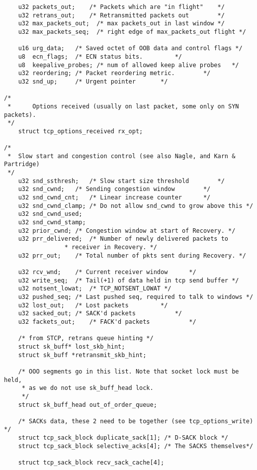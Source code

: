 \begin{verbatim}
    u32 packets_out;    /* Packets which are "in flight"    */
    u32 retrans_out;    /* Retransmitted packets out        */
    u32 max_packets_out;  /* max packets_out in last window */
    u32 max_packets_seq;  /* right edge of max_packets_out flight */

    u16 urg_data;   /* Saved octet of OOB data and control flags */
    u8  ecn_flags;  /* ECN status bits.         */
    u8  keepalive_probes; /* num of allowed keep alive probes   */
    u32 reordering; /* Packet reordering metric.        */
    u32 snd_up;     /* Urgent pointer       */

/*
 *      Options received (usually on last packet, some only on SYN packets).
 */
    struct tcp_options_received rx_opt;

/*
 *  Slow start and congestion control (see also Nagle, and Karn & Partridge)
 */
    u32 snd_ssthresh;   /* Slow start size threshold        */
    u32 snd_cwnd;   /* Sending congestion window        */
    u32 snd_cwnd_cnt;   /* Linear increase counter      */
    u32 snd_cwnd_clamp; /* Do not allow snd_cwnd to grow above this */
    u32 snd_cwnd_used;
    u32 snd_cwnd_stamp;
    u32 prior_cwnd; /* Congestion window at start of Recovery. */
    u32 prr_delivered;  /* Number of newly delivered packets to
                 * receiver in Recovery. */
    u32 prr_out;    /* Total number of pkts sent during Recovery. */

    u32 rcv_wnd;    /* Current receiver window      */
    u32 write_seq;  /* Tail(+1) of data held in tcp send buffer */
    u32 notsent_lowat;  /* TCP_NOTSENT_LOWAT */
    u32 pushed_seq; /* Last pushed seq, required to talk to windows */
    u32 lost_out;   /* Lost packets         */
    u32 sacked_out; /* SACK'd packets           */
    u32 fackets_out;    /* FACK'd packets           */

    /* from STCP, retrans queue hinting */
    struct sk_buff* lost_skb_hint;
    struct sk_buff *retransmit_skb_hint;

    /* OOO segments go in this list. Note that socket lock must be held,
     * as we do not use sk_buff_head lock.
     */
    struct sk_buff_head out_of_order_queue;

    /* SACKs data, these 2 need to be together (see tcp_options_write) */
    struct tcp_sack_block duplicate_sack[1]; /* D-SACK block */
    struct tcp_sack_block selective_acks[4]; /* The SACKS themselves*/

    struct tcp_sack_block recv_sack_cache[4];


\end{verbatim}

